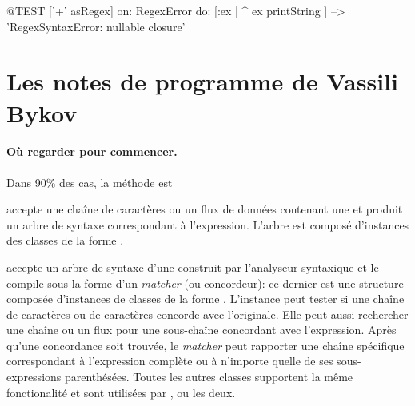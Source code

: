 \documentclass[a4paper,10pt,twoside]{book}
\begin{document}
{\begin{itemize}

\end{itemize}


\begin{code}{@TEST}
['+' asRegex] on: RegexError do: [:ex | ^ ex printString ]                                        --> 'RegexSyntaxError:  nullable closure'
\end{code}
\section{Les notes de programme de Vassili Bykov}

\paragraph{Où regarder pour commencer.}
Dans 90\% des cas, la méthode  est 

 accepte une chaîne de caractères ou un flux de
données contenant une \expreg et produit un arbre de syntaxe
correspondant à l'expression. L'arbre est composé d'instances des
classes de la forme .

 accepte un arbre de syntaxe d'une \expreg construit
par l'analyseur syntaxique et le compile sous la forme d'un
\emph{matcher} (ou concordeur): ce dernier est une structure composée
d'instances de classes de la forme . 
L'instance  peut tester si une chaîne de caractères
ou  %
de caractères concorde avec l'\expreg originale. Elle peut aussi
rechercher une chaîne ou un flux pour une sous-chaîne concordant avec
l'expression. Après qu'une concordance soit trouvée, le \emph{matcher}
peut rapporter une chaîne spécifique correspondant à l'expression
complète ou à n'importe quelle de ses sous-expressions parenthésées.
Toutes les autres classes supportent la même fonctionalité et sont
utilisées par ,  ou les deux.

}
\end{document}
